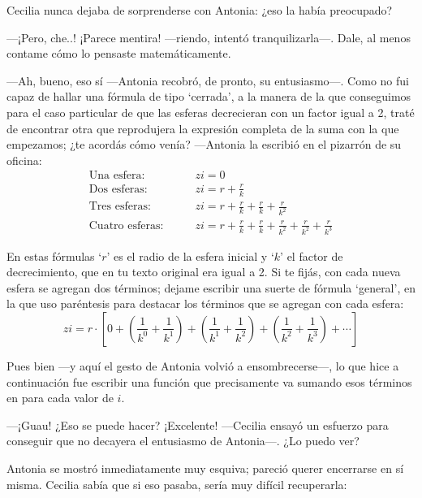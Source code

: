Cecilia nunca dejaba de sorprenderse con Antonia: ¿eso la había
preocupado?

---¡Pero, che..! ¡Parece mentira! ---riendo, intentó
tran\-qui\-li\-zar\-la---.  Dale, al menos contame cómo lo pensaste
matemáticamente.

---Ah, bueno, eso sí ---Antonia recobró, de pronto, su
en\-tu\-sias\-mo---.  Como no fui capaz de hallar una fórmula de tipo
`cerrada', a la manera de la que conseguimos para el caso particular
de que las esferas decrecieran con un factor igual a 2, traté de
encontrar otra que reprodujera la expresión completa de la suma con la
que empezamos; ¿te acordás cómo venía? ---Antonia la escribió en el
pizarrón de su oficina:
\begin{align*}
  \text{Una esfera:}\qquad & zi = 0 \\
  \text{Dos esferas:}\qquad & zi = r+\frac{r}{k} \\
  \text{Tres esferas:}\qquad & zi = r+\frac{r}{k} + \frac{r}{k}+ \frac{r}{k^2}\\
  \text{Cuatro esferas:}\qquad & zi = r+\frac{r}{k} + \frac{r}{k}+ \frac{r}{k^2}+ \frac{r}{k^2}+ \frac{r}{k^3}
\end{align*}

\guillemotright En estas fórmulas `$r$' es el radio de la esfera
inicial y `$k$' el factor de decrecimiento, que en tu texto original
era igual a 2. Si te fijás, con cada nueva esfera se agregan dos
términos; dejame escribir una suerte de fórmula `general', en la que
uso paréntesis para destacar los términos que se agregan con cada
esfera:
\begin{equation}
  zi = r \cdot \left[ 0 + \left(  \frac{1}{k^0} + \frac{1}{k^1} \right) +
    \left( \frac{1}{k^1} + \frac{1}{k^2} \right) +
    \left( \frac{1}{k^2} + \frac{1}{k^3} \right) + \cdots \right]
  \label{eq:formula-torre}
\end{equation}

\guillemotright Pues bien ---y aquí el gesto de Antonia volvió a
en\-som\-bre\-cer\-se---, lo que hice a continuación fue escribir una
función que precisamente va sumando esos términos en \openscad{} para
cada valor de $i$.

---¡Guau! ¿Eso se puede hacer? ¡Excelente! ---Cecilia ensayó un
esfuerzo para conseguir que no decayera el entusiasmo de
An\-to\-nia---.  ¿Lo puedo ver?

Antonia se mostró inmediatamente muy esquiva; pareció querer
encerrarse en sí misma. Cecilia sabía que si eso pasaba, sería muy
difícil recuperarla:

